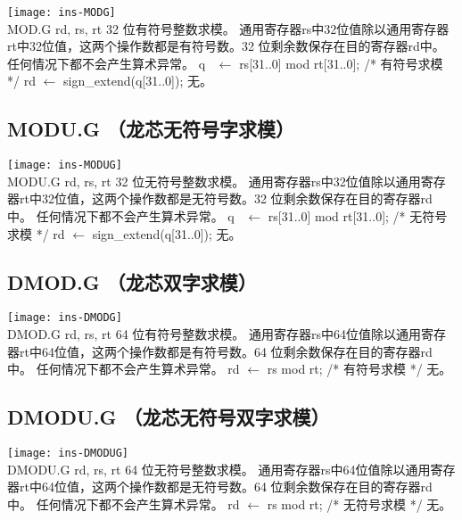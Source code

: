 \begin{instructionblk}
  \texttt{[image: ins-MODG]} \\
  \instructionbody
  {MOD.G rd, rs, rt}
  {32 位有符号整数求模。}
  {通用寄存器rs中32位值除以通用寄存器rt中32位值，这两个操作数都是有符号数。32
  位剩余数保存在目的寄存器rd中。 \fldnewline
  任何情况下都不会产生算术异常。}
  {q~ $\leftarrow$ rs[31..0] mod rt[31..0]; /* 有符号求模 */ \newline
  rd $\leftarrow$ sign\_extend(q[31..0]);}
  {无。}
\end{instructionblk}

\subsection{MODU.G （龙芯无符号字求模）}

\begin{instructionblk}
  \texttt{[image: ins-MODUG]} \\
  \instructionbody
  {MODU.G rd, rs, rt}
  {32 位无符号整数求模。}
  {通用寄存器rs中32位值除以通用寄存器rt中32位值，这两个操作数都是无符号数。32
  位剩余数保存在目的寄存器rd中。 \fldnewline
  任何情况下都不会产生算术异常。}
  {q~ $\leftarrow$ rs[31..0] mod rt[31..0]; /* 无符号求模 */ \newline
  rd $\leftarrow$ sign\_extend(q[31..0]);}
  {无。}
\end{instructionblk}

\subsection{DMOD.G （龙芯双字求模）}

\begin{instructionblk}
  \texttt{[image: ins-DMODG]} \\
  \instructionbody
  {DMOD.G rd, rs, rt}
  {64 位有符号整数求模。}
  {通用寄存器rs中64位值除以通用寄存器rt中64位值，这两个操作数都是有符号数。64
  位剩余数保存在目的寄存器rd中。 \fldnewline
  任何情况下都不会产生算术异常。}
  {rd $\leftarrow$ rs mod rt; /* 有符号求模 */}
  {无。}
\end{instructionblk}

\subsection{DMODU.G （龙芯无符号双字求模）}

\begin{instructionblk}
  \texttt{[image: ins-DMODUG]} \\
  \instructionbody
  {DMODU.G rd, rs, rt}
  {64 位无符号整数求模。}
  {通用寄存器rs中64位值除以通用寄存器rt中64位值，这两个操作数都是无符号数。64
  位剩余数保存在目的寄存器rd中。 \fldnewline
  任何情况下都不会产生算术异常。}
  {rd $\leftarrow$ rs mod rt; /* 无符号求模 */}
  {无。}
\end{instructionblk}

